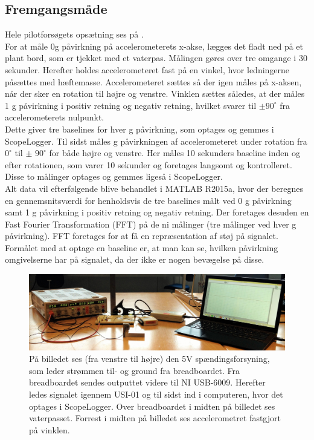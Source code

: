 \subsection{Fremgangsmåde}
Hele pilotforsøgets opsætning ses på . \\
For at måle 0g påvirkning på accelerometerets x-akse, lægges det fladt ned på et plant bord, som er tjekket med et vaterpas. Målingen gøres over tre omgange i 30 sekunder. Herefter holdes accelerometeret fast på en vinkel, hvor ledningerne påsættes med hæftemasse. Accelerometeret sættes så der igen måles på x-aksen, når der sker en rotation til højre og venstre. Vinklen sættes således, at der måles 1 g påvirkning i positiv retning og negativ retning, hvilket svarer til $\pm 90^{\circ}$ fra accelerometerets nulpunkt. \\
Dette giver tre baselines for hver g påvirkning, som optages og gemmes i ScopeLogger. %
Til sidst måles g påvirkningen af accelerometeret under rotation fra $0^{\circ}$ til $\pm$ $90^{\circ}$ for både højre og venstre. Her måles 10 sekunders baseline inden og efter rotationen, som varer 10 sekunder og foretages langsomt og kontrolleret. Disse to målinger optages og gemmes ligeså i ScopeLogger. \\
Alt data vil efterfølgende blive behandlet i MATLAB R2015a, hvor der beregnes en gennemsnitsværdi for henholdsvis de tre baselines målt ved 0 g påvirkning samt 1 g påvirkning i positiv retning og negativ retning. Der foretages desuden en Fast Fourier Transformation (FFT) på de ni målinger (tre målinger ved hver g påvirkning). FFT foretages for at få en repræsentation af støj på signalet. Formålet med at optage en baseline er, at man kan se, hvilken påvirkning omgivelserne har på signalet, da der ikke er nogen bevægelse på disse.

\begin{figure}[H]
	\centering
	\includegraphics[scale=0.14]{figures/cProblemloesning/Pilotforsoeg1_2.jpg}
	\caption{På billedet ses (fra venstre til højre) den 5V spændingsforsyning, som leder strømmen til- og ground fra breadboardet. Fra breadboardet sendes outputtet videre til NI USB-6009. Herefter ledes signalet igennem USI-01 og til sidst ind i computeren, hvor det optages i ScopeLogger. Over breadboardet i midten på billedet ses vaterpasset. Forrest i midten på billedet ses accelerometret fastgjort på vinklen.}
	\label{pforsoeg2}
\end{figure}

